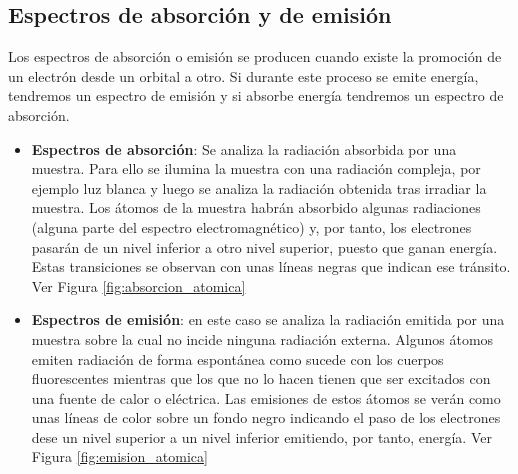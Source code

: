 \subsection{Espectros de absorción y de emisión}\label{subsec:espectros-de-absorcion-y-de-emision}

Los espectros de absorción o emisión se producen cuando existe la promoción de un electrón desde un orbital a otro.
Si durante este proceso se emite energía, tendremos un espectro de emisión y si absorbe energía tendremos un espectro de absorción.
\begin{itemize}
    \item \textbf{Espectros de absorción}: Se analiza la radiación absorbida por una muestra.
    Para ello se ilumina la muestra con una radiación compleja, por ejemplo luz blanca y luego se analiza la radiación obtenida tras irradiar la muestra.
    Los átomos de la muestra habrán absorbido algunas radiaciones (alguna parte del espectro electromagnético) y, por tanto, los electrones pasarán de un nivel inferior a otro nivel superior, puesto que ganan energía.
    Estas transiciones se observan con unas líneas negras que indican ese tránsito. Ver Figura \ref{fig:absorcion_atomica}


    \item \textbf{Espectros de emisión}: en este caso se analiza la radiación emitida por una muestra sobre la cual no incide ninguna radiación externa. Algunos átomos emiten radiación de forma espontánea como sucede con los cuerpos fluorescentes mientras que los que no lo hacen tienen que ser excitados con una fuente de calor o eléctrica. Las emisiones de estos átomos se verán como unas líneas de color sobre un fondo negro indicando el paso de los electrones dese un nivel superior a un nivel inferior emitiendo, por tanto, energía. Ver Figura \ref{fig:emision_atomica}
\end{itemize}

